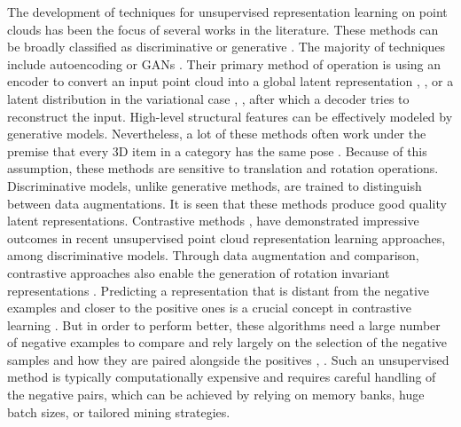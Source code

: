 \vspace{5mm}

The development of techniques for unsupervised representation learning on point clouds has been the focus of several works in the literature. These methods can be broadly classified as discriminative \cite{grill2020bootstrap} or generative \cite{sarmad2019rl}. The majority of techniques include autoencoding \cite{yang2018foldingnet} or \ac{GAN}s \cite{sarmad2019rl}.  Their primary method of operation is using an encoder to convert an input point cloud into a global latent representation \cite{rao2020global}, \cite{shi2020unsupervised}, or a latent distribution in the variational case \cite{hassani2019unsupervised}, \cite{han2019multi}, after which a decoder tries to reconstruct the input. High-level structural features can be effectively modeled by generative models. Nevertheless, a lot of these methods often work under the premise that every 3D item in a category has the same pose \cite{sanghi2020info3d}. Because of this assumption, these methods are sensitive to translation and rotation operations. Discriminative models, unlike generative methods, are trained to distinguish between data augmentations. It is seen that these methods produce good quality latent representations. Contrastive methods \cite{rao2020global}, \cite{sanghi2020info3d} have demonstrated impressive outcomes in recent unsupervised point cloud representation learning approaches, among discriminative models. Through data augmentation and comparison, contrastive approaches also enable the generation of rotation invariant representations \cite{poursaeed2020self}. Predicting a representation that is distant from the negative examples and closer to the positive ones is a crucial concept in contrastive learning \cite{chen2020simple}. But in order to perform better, these algorithms need a large number of negative examples to compare and rely largely on the selection of the negative samples and how they are paired alongside the positives \cite{grill2020bootstrap}, \cite{chen2021exploring}. Such an unsupervised method is typically computationally expensive and requires careful handling of the negative pairs, which can be achieved by relying on memory banks, huge batch sizes, or tailored mining strategies.\cite{grill2020bootstrap}

\vspace{5mm}


